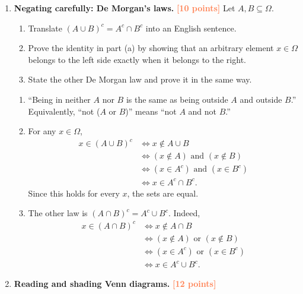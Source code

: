 \documentclass[11pt]{article}
\newcommand{\points}[1]{\hfill\textcolor{coral}{\small\bfseries[#1 points]}}
\begin{document}
\begin{enumerate}
\item \textbf{Negating carefully: De Morgan's laws.} \points{10}
Let $A,B\subseteq\Omega$.
\begin{enumerate}
  \item Translate $(A\cup B)^c=A^c\cap B^c$ into an English sentence.
  \item Prove the identity in part (a) by showing that an arbitrary element
  $x\in\Omega$ belongs to the left side exactly when it belongs to the right.
  \item State the other De Morgan law and prove it in the same way.
\end{enumerate}
\begin{solution}
\begin{enumerate}
  \item ``Being in neither $A$ nor $B$ is the same as being outside $A$ and
  outside $B$.'' Equivalently, ``not ($A$ or $B$)'' means ``not $A$ and not $B$.''
  \item For any $x\in\Omega$,
  \begin{align*}
  x\in(A\cup B)^c
  &\iff x\notin A\cup B\\
  &\iff (x\notin A)\text{ and }(x\notin B)\\
  &\iff (x\in A^c)\text{ and }(x\in B^c)\\
  &\iff x\in A^c\cap B^c.
  \end{align*}
  Since this holds for every $x$, the sets are equal.
  \item The other law is $(A\cap B)^c=A^c\cup B^c$. Indeed,
  \begin{align*}
  x\in(A\cap B)^c
  &\iff x\notin A\cap B\\
  &\iff (x\notin A)\text{ or }(x\notin B)\\
  &\iff (x\in A^c)\text{ or }(x\in B^c)\\
  &\iff x\in A^c\cup B^c.
  \end{align*}
\end{enumerate}
\end{solution}

\item \textbf{Reading and shading Venn diagrams.} \points{12}


\end{enumerate}
\end{document}
